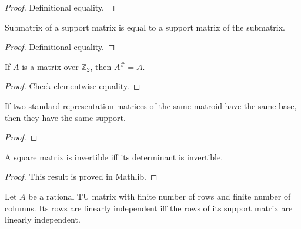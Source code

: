 \begin{proof}
    \leanok
    Definitional equality.
\end{proof}

\begin{lemma}
    \label{Matrix.support_submatrix}
    \leanok
    Submatrix of a support matrix is equal to a support matrix of the submatrix.
\end{lemma}

\begin{proof}
    \leanok
    Definitional equality.
\end{proof}

\begin{lemma}
    \label{Matrix.support_Z2}
    \leanok
    If $A$ is a matrix over $\mathbb{Z}_{2}$, then $A^{\#} = A$.
\end{lemma}

\begin{proof}
    \leanok
    Check elementwise equality.
\end{proof}

\begin{lemma}
    \label{support_eq_support_of_same_matroid_same_X}
    \leanok
    If two standard representation matrices of the same matroid have the same base, then they have the same support.
\end{lemma}

\begin{proof}
    \leanok
    \SeeLean
\end{proof}

\begin{lemma}
    \label{Matrix.isUnit_iff_isUnit_det}
    \leanok
    A square matrix is invertible iff its determinant is invertible.
\end{lemma}

\begin{proof}
    \leanok
    This result is proved in Mathlib.
\end{proof}

\begin{lemma}
    \label{Matrix.IsTotallyUnimodular.linearIndependent_iff_support_linearIndependent_of_finite_of_finite}
    \leanok
    Let $A$ be a rational TU matrix with finite number of rows and finite number of columns.
    Its rows are linearly independent iff the rows of its support matrix are linearly independent.
\end{lemma}

